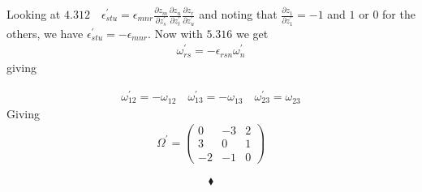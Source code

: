 Looking at $\mathbf{4.312} \quad \epsilon_{stu}^{'} = \epsilon_{mnr}^{} \frac{\partial z_m}{\partial z_s^{'}}\frac{\partial z_n}{\partial z_t^{'}}\frac{\partial z_r^{}}{\partial z_u^{'}}$ and noting that $\frac{\partial z_1}{\partial z_1^{'}}=-1$ and $1$ or $0$ for the others, we have
$\epsilon_{stu}^{'} = -\epsilon_{mnr}^{}$.
Now with $\mathbf{5.316}$ we get
\begin{align}
 \omega_{rs}^{'}=-\epsilon_{rsn}\omega_{n}^{'}
 \end{align}
 giving
 
 \begin{align}
 \omega_{12}^{'}= -\omega_{12}^{}\quad\omega_{13}^{'}= -\omega_{13}^{}\quad\omega_{23}^{'}= \omega_{23}^{}
 \end{align}
 Giving
 \begin{align}
\Omega^{'} =\left( \begin{matrix}
0&-3&2\\
3&0&1\\
-2&-1&0
\end{matrix}\right)
\end{align}
 
$$\blacklozenge$$